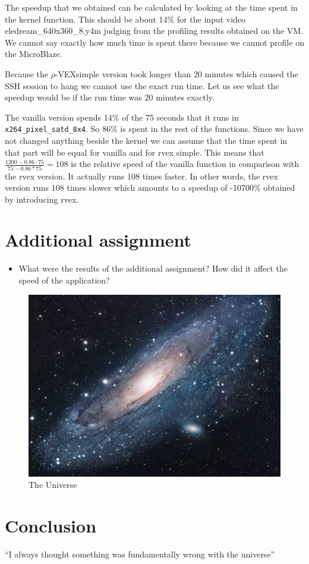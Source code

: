 \documentclass{article}
\newcommand{\rvex}{\ensuremath{\rho}-VEX}
\newcommand{\satd}{\texttt{x264\_pixel\_satd\_8x4}}
\begin{document}
The speedup that we obtained can be calculated by looking at the time spent in
the kernel function. This should be about 14\% for the input video
eledream\_640x360\_8.y4m judging from the profiling results obtained on the
VM\@. We cannot say exactly how much time is spent there because we cannot
profile on the MicroBlaze.

Because the \rvex simple version took longer than 20 minutes which caused the
SSH session to hang we cannot use the exact run time. Let us see what the
speedup would be if the run time was 20 minutes exactly.

The vanilla version spends 14\% of the 75 seconds that it runs in \satd{}. So
86\% is spent in the rest of the functions. Since we have not changed anything
beside the kernel we can assume that the time spent in that part will be equal
for vanilla and for rvex simple. This means that $\frac{1200 - 0.86\cdot75}{75 -
0.86*75} = 108$ is the relative speed of the vanilla function in comparison
with the rvex version.  It actually runs 108 times faster.  In other words, the
rvex version runs 108 times slower which amounts to a speedup of -10700\%
obtained by introducing rvex.

\section{Additional assignment}

\begin{itemize}
  \item What were the results of the additional assignment? How did it affect
        the speed of the application?
\end{itemize}

\begin{figure}[h!]
  \centering
  \includegraphics[scale=1.7]{universe.jpg}
  \caption{The Universe}
  \label{threadsVsSync}
\end{figure}

\section{Conclusion}

``I always thought something was fundamentally wrong with the universe'' \citep{adams1995hitchhiker}



\end{document}
